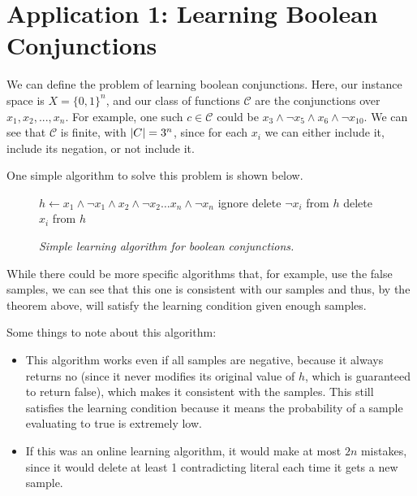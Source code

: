 \documentclass{article}
\DeclarePairedDelimiter\abs{\lvert}{\rvert}
\begin{document}
\section{Application 1: Learning Boolean Conjunctions}
We can define the problem of learning boolean conjunctions. Here, our instance
space is $X = \{0, 1\}^n$, and our class of functions $\mathcal{C}$ are the
conjunctions over $x_1, x_2, ..., x_n$. For example, one such $c \in \mathcal{C}$
could be $x_3 \wedge \neg x_5 \wedge x_6 \wedge \neg x_{10}$. We can see that
$\mathcal{C}$ is finite, with $\abs{C} = 3^n$, since for
each $x_i$ we can either include it, include its negation, or not include it.

One simple algorithm to solve this problem is shown below.

\begin{figure}[H]
\begin{framed}
    \begin{algorithmic}
        \State $h \leftarrow x_1 \wedge \neg x_1 \wedge x_2 \wedge \neg x_2 \dots x_n \wedge \neg x_n$
             \State ignore
            \Else {} \State delete $\neg x_i$ from $h$
                \Else
                \State delete $x_i$ from $h$
                \EndIf
            \EndIf
        \EndFor
    \end{algorithmic}
\end{framed}
\begin{center}
    \emph{Simple learning algorithm for boolean conjunctions.}
\end{center}
\end{figure}

While there could be more specific algorithms that, for example, use the
false samples, we can see that this one is consistent with our samples
and thus, by the theorem above, will satisfy the learning condition
given enough samples.

Some things to note about this algorithm:
\begin{itemize}
    \item This algorithm works even if all samples are negative,
    because it always returns no (since it never modifies its
    original value of $h$, which is guaranteed to return false),
    which makes it consistent with the samples. This still satisfies
    the learning condition because it means the probability of a
    sample evaluating to true is extremely low.
    \item If this was an online learning algorithm, it would make
    at most $2n$ mistakes, since it would delete at least 1
    contradicting literal each time it gets a new sample.
\end{itemize}
\end{document}
